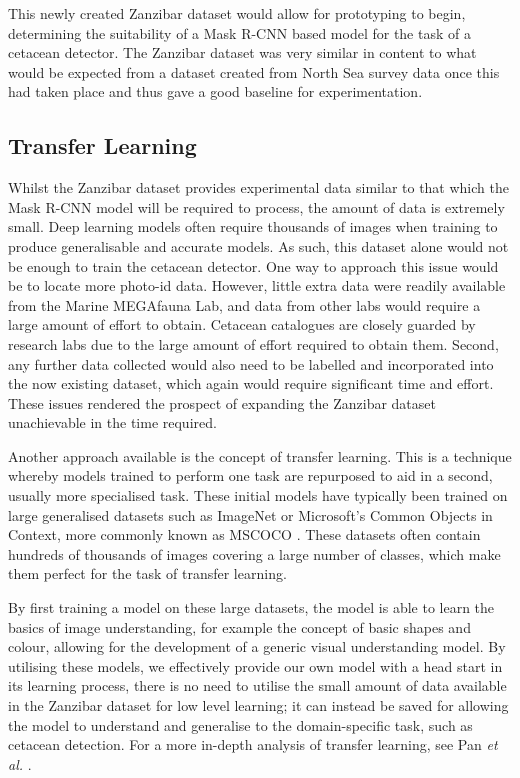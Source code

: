 This newly created Zanzibar dataset would allow for prototyping to begin, determining the suitability of a Mask R-CNN based model for the task of a cetacean detector. The Zanzibar dataset was very similar in content to what would be expected from a dataset created from North Sea survey data once this had taken place and thus gave a good baseline for experimentation. 

\subsection{Transfer Learning}\label{ch:cetDet,sec:initialTesting,sub:transferLearning}

Whilst the Zanzibar dataset provides experimental data similar to that which the Mask R-CNN model will be required to process, the amount of data is extremely small. Deep learning models often require thousands of images when training to produce generalisable and accurate models. As such, this dataset alone would not be enough to train the cetacean detector. One way to approach this issue would be to locate more photo-id data. However, little extra data were readily available from the Marine MEGAfauna Lab, and data from other labs would require a large amount of effort to obtain. Cetacean catalogues are closely guarded by research labs due to the large amount of effort required to obtain them. Second, any further data collected would also need to be labelled and incorporated into the now existing dataset, which again would require significant time and effort. These issues rendered the prospect of expanding the Zanzibar dataset unachievable in the time required. 

Another approach available is the concept of transfer learning. This is a technique whereby models trained to perform one task are repurposed to aid in a second, usually more specialised task. These initial models have typically been trained on large generalised datasets such as ImageNet \cite{deng_imagenet:_2009} or Microsoft's Common Objects in Context, more commonly known as MSCOCO \cite{lin_microsoft_2014}. These datasets often contain hundreds of thousands of images covering a large number of classes, which make them perfect for the task of transfer learning. 

By first training a model on these large datasets, the model is able to learn the basics of image understanding, for example the concept of basic shapes and colour, allowing for the development of a generic visual understanding model. By utilising these models, we effectively provide our own model with a head start in its learning process, there is no need to utilise the small amount of data available in the Zanzibar dataset for low level learning; it can instead be saved for allowing the model to understand and generalise to the domain-specific task, such as cetacean detection. For a more in-depth analysis of transfer learning, see Pan \textit{et al.} \cite{pan_survey_2010}.

